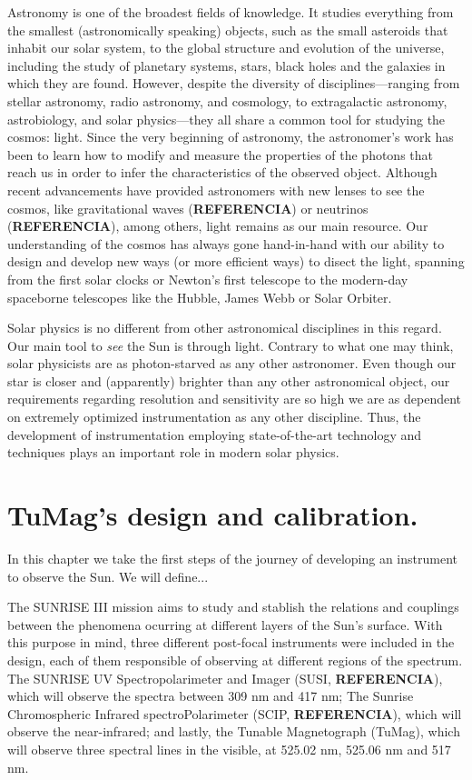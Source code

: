 \documentclass[12pt]{mythesis}
\begin{document}
Astronomy is one of the broadest fields of knowledge. It studies everything from the smallest (astronomically speaking) objects, such as the small asteroids that inhabit our solar system, to the global structure and evolution of the universe, including the study of planetary systems, stars, black holes and the galaxies in which they are found. However, despite the diversity of disciplines—ranging from stellar astronomy, radio astronomy, and cosmology, to extragalactic astronomy, astrobiology, and solar physics—they all share a common tool for studying the cosmos: light. Since the very beginning of astronomy, the astronomer's work has been to learn how to modify and measure the properties of the photons that reach us in order to infer the characteristics of the observed object. Although recent advancements have provided astronomers with new lenses to see the cosmos, like gravitational waves (\textbf{REFERENCIA}) or neutrinos (\textbf{REFERENCIA}), among others, light remains as our main resource. Our understanding of the cosmos has always gone hand-in-hand with our ability to design and develop new ways (or more efficient ways) to disect the light, spanning from the first solar clocks or Newton's first telescope to the modern-day spaceborne telescopes like the Hubble, James Webb or Solar Orbiter. 

Solar physics is no different from other astronomical disciplines in this regard. Our main tool to \textit{see} the Sun is through light. Contrary to what one may think, solar physicists are as photon-starved as any other astronomer. Even though our star is closer and (apparently) brighter than any other astronomical object, our requirements regarding resolution and sensitivity are so high we are as dependent on extremely optimized instrumentation as any other discipline. Thus, the development of instrumentation employing state-of-the-art technology and techniques plays an important role in modern solar physics.


\chapter{TuMag's design and calibration.}

In this chapter we take the first steps of the journey of developing an instrument to observe the Sun. We will define... 

The SUNRISE III mission aims to study and stablish the relations and couplings between the phenomena ocurring at different layers of the Sun's surface. With this purpose in mind, three different post-focal instruments were included in the design, each of them responsible of observing at different regions of the spectrum. The SUNRISE UV Spectropolarimeter and Imager (SUSI, \textbf{REFERENCIA}), which will observe the spectra between 309 nm and 417 nm; The Sunrise Chromospheric Infrared spectroPolarimeter (SCIP, \textbf{REFERENCIA}), which will observe the near-infrared; and lastly, the Tunable Magnetograph (TuMag), which will observe three spectral lines in the visible, at 525.02 nm, 525.06 nm and 517 nm. 
\end{document}
